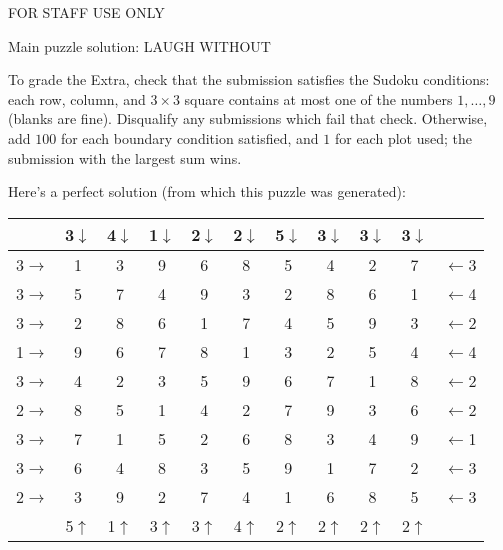 \begin{puzzleSolutions}
FOR STAFF USE ONLY

Main puzzle solution: LAUGH WITHOUT

To grade the Extra,
check that the submission satisfies the Sudoku conditions: each row,
column, and \(3\times3\) square contains at most one of the numbers
\(1,\dots,9\) (blanks are fine). Disqualify any submissions which fail that check.
Otherwise, add \(100\) for each boundary condition satisfied, and \(1\)
for each plot used; the submission with the largest sum wins.

Here's a perfect solution (from which this puzzle was generated):

\begin{center}\Large
\begin{tabular}{c||c|c|c||c|c|c||c|c|c||c}
  & 3\(\downarrow\) & 4\(\downarrow\) & 1\(\downarrow\) & 2\(\downarrow\) & 2\(\downarrow\) & 5\(\downarrow\) & 3\(\downarrow\) & 3\(\downarrow\) & 3\(\downarrow\) &   \\\hline\hline
3\(\rightarrow\) & 1 & 3 & 9 & 6 & 8 & 5 & 4 & 2 & 7 & \(\leftarrow\)3 \\\hline
3\(\rightarrow\) & 5 & 7 & 4 & 9 & 3 & 2 & 8 & 6 & 1 & \(\leftarrow\)4 \\\hline
3\(\rightarrow\) & 2 & 8 & 6 & 1 & 7 & 4 & 5 & 9 & 3 & \(\leftarrow\)2 \\\hline\hline
1\(\rightarrow\) & 9 & 6 & 7 & 8 & 1 & 3 & 2 & 5 & 4 & \(\leftarrow\)4 \\\hline
3\(\rightarrow\) & 4 & 2 & 3 & 5 & 9 & 6 & 7 & 1 & 8 & \(\leftarrow\)2 \\\hline
2\(\rightarrow\) & 8 & 5 & 1 & 4 & 2 & 7 & 9 & 3 & 6 & \(\leftarrow\)2 \\\hline\hline
3\(\rightarrow\) & 7 & 1 & 5 & 2 & 6 & 8 & 3 & 4 & 9 & \(\leftarrow\)1 \\\hline
3\(\rightarrow\) & 6 & 4 & 8 & 3 & 5 & 9 & 1 & 7 & 2 & \(\leftarrow\)3 \\\hline
2\(\rightarrow\) & 3 & 9 & 2 & 7 & 4 & 1 & 6 & 8 & 5 & \(\leftarrow\)3 \\\hline\hline
  & 5\(\uparrow\) & 1\(\uparrow\) & 3\(\uparrow\) & 3\(\uparrow\) & 4\(\uparrow\) & 2\(\uparrow\) & 2\(\uparrow\) & 2\(\uparrow\) & 2\(\uparrow\) &
\end{tabular}
\end{center}
\end{puzzleSolutions}
